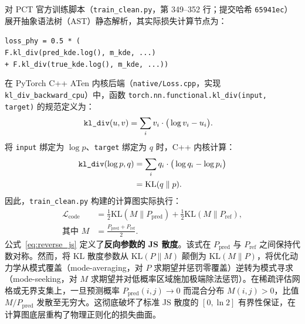 对 PCT 官方训练脚本（\texttt{train\_clean.py}，第 349--352 行；提交哈希 \texttt{65941ec}）展开抽象语法树（AST）静态解析，其实际损失计算节点为：
\begin{center}
\small
\begin{minipage}{0.95\columnwidth}
\texttt{loss\_phy = 0.5 * (} \\
\hspace*{1em}\texttt{F.kl\_div(pred\_kde.log(), m\_kde, ...)} \\
\hspace*{1em}\texttt{+ F.kl\_div(true\_kde.log(), m\_kde, ...))}
\end{minipage}
\end{center}
在 PyTorch C++ ATen 内核后端（\texttt{native/Loss.cpp}，实现 \texttt{kl\_div\_backward\_cpu}）中，函数 \texttt{torch.nn.functional.kl\_div(input, target)} 的规范定义为：
\begin{equation}
\begin{aligned}
&\text{\texttt{kl\_div}}(u, v) = \sum_{i} v_i \cdot \big( \log v_i - u_i \big).
\end{aligned}
\label{eq:pytorch_kl}
\end{equation}
将 \texttt{input} 绑定为 $\log p$、\texttt{target} 绑定为 $q$ 时，C++ 内核计算：
\begin{equation}
\begin{aligned}
\text{\texttt{kl\_div}}(\log p, q) &= \sum_{i} q_i \cdot \big( \log q_i - \log p_i \big) \\
&= \text{KL}(q \parallel p).
\end{aligned}
\label{eq:reverse_kl}
\end{equation}
因此，\texttt{train\_clean.py} 构建的计算图实际执行：
\begin{equation}
\begin{aligned}
\mathcal{L}_{\text{code}} &= \frac{1}{2} \text{KL}\left(M \parallel P_{\text{pred}}\right) + \frac{1}{2} \text{KL}\left(M \parallel P_{\text{ref}}\right), \\
\text{其中 } M &= \frac{P_{\text{pred}} + P_{\text{ref}}}{2}.
\end{aligned}
\label{eq:reverse_js}
\end{equation}
公式~\eqref{eq:reverse_js} 定义了\textbf{反向参数的 JS 散度}。该式在 $P_{\text{pred}}$ 与 $P_{\text{ref}}$ 之间保持代数对称。然而，将 KL 散度参数从 $\text{KL}(P \parallel M)$ 颠倒为 $\text{KL}(M \parallel P)$，将优化动力学从模式覆盖（mode-averaging，对 $P$ 求期望并惩罚零覆盖）逆转为模式寻求（mode-seeking，对 $M$ 求期望并对低概率区域施加极端除法惩罚）。在稀疏评估网格或无界支集上，一旦预测概率 $P_{\text{pred}}(i,j) \to 0$ 而混合分布 $M(i,j) > 0$，比值 $M/P_{\text{pred}}$ 发散至无穷大。这彻底破坏了标准 JS 散度的 $[0, \ln 2]$ 有界性保证，在计算图底层重构了物理正则化的损失曲面。

